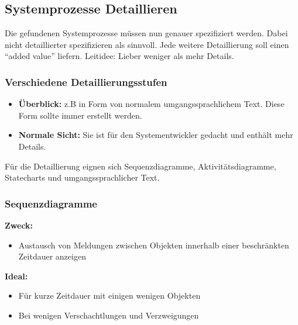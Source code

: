 \subsection{Systemprozesse Detaillieren}
Die gefundenen Systemprozesse müssen nun genauer spezifiziert werden. Dabei nicht detaillierter spezifizieren als sinnvoll. Jede weitere Detaillierung soll einen "`added value"' liefern. 
Leitidee: Lieber weniger als mehr Details.

\subsubsection{Verschiedene Detaillierungsstufen}
\begin{itemize}
	\item \textbf{Überblick: } z.B in Form von normalem umgangssprachlichem Text. Diese Form sollte immer erstellt werden.
	\item \textbf{Normale Sicht: } Sie ist für den Systementwickler gedacht und enthält mehr Details.  
\end{itemize}

Für die Detaillierung eignen sich Sequenzdiagramme, Aktivitätsdiagramme, Statecharts und umgangssprachlicher Text.

\subsubsection{Sequenzdiagramme}

\begin{multicols}{2}
	\textbf{Zweck:}
	\begin{itemize}
		\item Austausch von Meldungen zwischen Objekten innerhalb einer beschränkten Zeitdauer anzeigen
	\end{itemize}
	\columnbreak
	
	\textbf{Ideal:}
	\begin{itemize}
		\item Für kurze Zeitdauer mit einigen wenigen Objekten
		\item Bei wenigen Verschachtlungen und Verzweigungen
	\end{itemize}
\end{multicols}

